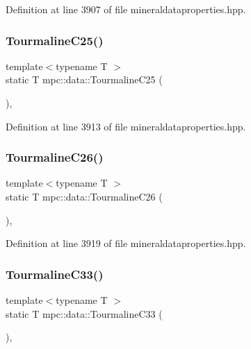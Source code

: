 Definition at line 3907 of file mineraldataproperties.\+hpp.

\mbox{\label{namespacempc_1_1data_a9fd2e712789e7197200e90b756587403}} 
\subsubsection{\texorpdfstring{Tourmaline\+C25()}{TourmalineC25()}}
{\footnotesize\ttfamily template$<$typename T $>$ \\
static T mpc\+::data\+::\+Tourmaline\+C25 (\begin{DoxyParamCaption}{ }\end{DoxyParamCaption})\hspace{0.3cm}{\ttfamily [inline]}, {\ttfamily [static]}}



Definition at line 3913 of file mineraldataproperties.\+hpp.

\mbox{\label{namespacempc_1_1data_aa461c998e0a5bcf69f782e2c7d11a63b}} 
\subsubsection{\texorpdfstring{Tourmaline\+C26()}{TourmalineC26()}}
{\footnotesize\ttfamily template$<$typename T $>$ \\
static T mpc\+::data\+::\+Tourmaline\+C26 (\begin{DoxyParamCaption}{ }\end{DoxyParamCaption})\hspace{0.3cm}{\ttfamily [inline]}, {\ttfamily [static]}}



Definition at line 3919 of file mineraldataproperties.\+hpp.

\mbox{\label{namespacempc_1_1data_a866eb9c87a1d016b09f6e829a999c43b}} 
\subsubsection{\texorpdfstring{Tourmaline\+C33()}{TourmalineC33()}}
{\footnotesize\ttfamily template$<$typename T $>$ \\
static T mpc\+::data\+::\+Tourmaline\+C33 (\begin{DoxyParamCaption}{ }\end{DoxyParamCaption})\hspace{0.3cm}{\ttfamily [inline]}, {\ttfamily [static]}}



